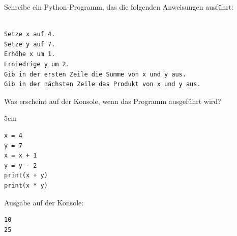 \question[3]
Schreibe ein Python-Programm, das die folgenden Anweisungen ausführt:
\begin{lstlisting}

Setze x auf 4.
Setze y auf 7.
Erhöhe x um 1.
Erniedrige y um 2.
Gib in der ersten Zeile die Summe von x und y aus.
Gib in der nächsten Zeile das Produkt von x und y aus.
\end{lstlisting}
Was erscheint auf der Konsole, wenn das Programm ausgeführt wird?

\begin{solutionbox}{5cm}
\begin{lstlisting}
x = 4
y = 7   
x = x + 1
y = y - 2
print(x + y)
print(x * y)
\end{lstlisting}
Ausgabe auf der Konsole:
\begin{lstlisting}
10
25
\end{lstlisting}
\end{solutionbox}